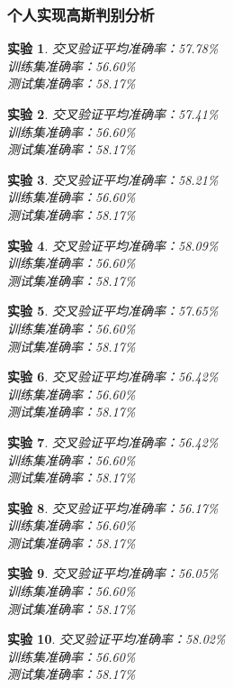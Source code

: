 \documentclass[cn,hazy,blue,14pt,normal]{elegantnote}
\newtheorem{train}{实验}
\begin{document}
\subsubsection{个人实现高斯判别分析}
\begin{train}交叉验证平均准确率：57.78\% \\  训练集准确率：56.60\% \\  测试集准确率：58.17\% \end{train}
\begin{train}交叉验证平均准确率：57.41\% \\  训练集准确率：56.60\% \\  测试集准确率：58.17\% \end{train}
\begin{train}交叉验证平均准确率：58.21\% \\  训练集准确率：56.60\% \\  测试集准确率：58.17\% \end{train}
\begin{train}交叉验证平均准确率：58.09\% \\  训练集准确率：56.60\% \\  测试集准确率：58.17\% \end{train}
\begin{train}交叉验证平均准确率：57.65\% \\  训练集准确率：56.60\% \\  测试集准确率：58.17\% \end{train}
\begin{train}交叉验证平均准确率：56.42\% \\  训练集准确率：56.60\% \\  测试集准确率：58.17\% \end{train}
\begin{train}交叉验证平均准确率：56.42\% \\  训练集准确率：56.60\% \\  测试集准确率：58.17\% \end{train}
\begin{train}交叉验证平均准确率：56.17\% \\  训练集准确率：56.60\% \\  测试集准确率：58.17\% \end{train}
\begin{train}交叉验证平均准确率：56.05\% \\  训练集准确率：56.60\% \\  测试集准确率：58.17\% \end{train}
\begin{train}交叉验证平均准确率：58.02\% \\  训练集准确率：56.60\% \\  测试集准确率：58.17\% \end{train}
\end{document}
